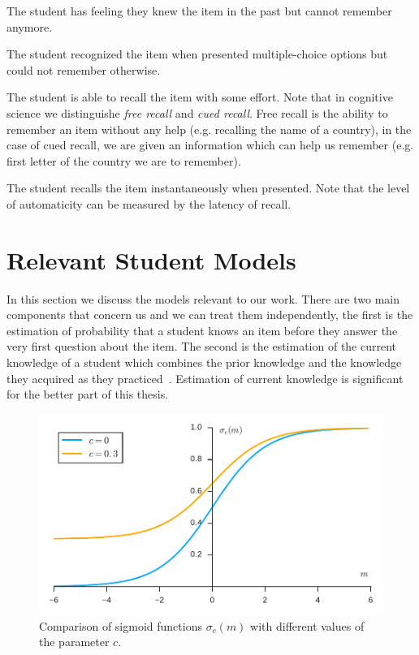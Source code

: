 \begin{description}[leftmargin=0cm]
  \item[Familiarity] The student has feeling they knew the item in the past but cannot remember anymore.
  \item[Recognition] The student recognized the item when presented multiple-choice options but could not remember otherwise.
  \item[Recall] The student is able to recall the item with some effort. Note that in cognitive science we distinguishe \textit{free recall} and \textit{cued recall}. Free recall is the ability to remember an item without any help (e.g. recalling the name of a country), in the case of cued recall, we are given an information which can help us remember (e.g. first letter of the country we are to remember).
  \item[Automaticity] The student recalls the item instantaneously when presented. Note that the level of automaticity can be measured by the latency of recall.
\end{description}

\section{Relevant Student Models}
\label{relevant-models}

In this section we discuss the models relevant to our work. There are two main components that concern us and we can treat them independently, the first is the estimation of probability that a student knows an item before they answer the very first question about the item. The second is the estimation of the current knowledge of a student which combines the prior knowledge and the knowledge they acquired as they practiced~\cite{Papousek2014}. Estimation of current knowledge is significant for the better part of this thesis.

\begin{figure}[htbp]
  \centering
  \includegraphics[width=\textwidth]{img/sigmoid-function}
  \caption{Comparison of sigmoid functions $\sigma_c(m)$ with different values of the parameter $c$.}
  \label{fig:spacing-effect}
\end{figure}

